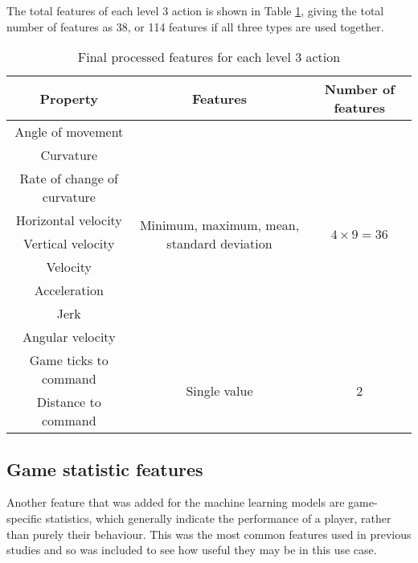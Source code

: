 \documentclass[Report.tex]{subfiles}
\begin{document}
The total features of each level 3 action is shown in Table \ref{tbl-level3features}, giving the total number of features as 38, or 114 features if all three types are used together.
\begin{table}[H]
\renewcommand*{\arraystretch}{1.5}
\centering
\begin{tabular}{| c | c | c |}
\hline
\textbf{Property} & \textbf{Features} & \textbf{Number of features} \\ \hline
Angle of movement & \multirow{9}{6cm}{Minimum, maximum, mean, standard deviation} & \multirow{9}{*}{$4 \times 9  = 36$} \\ \cline{1-1}
Curvature & & \\ \cline{1-1}
Rate of change of curvature & & \\ \cline{1-1}
Horizontal velocity & & \\ \cline{1-1}
Vertical velocity & & \\ \cline{1-1}
Velocity & & \\ \cline{1-1}
Acceleration & & \\ \cline{1-1}
Jerk & & \\ \cline{1-1}
Angular velocity & & \\ \hline
Game ticks to command & \multirow{2}{*}{Single value} & \multirow{2}{*}{2} \\ \cline{1-1}
Distance to command & & \\ \hline
\end{tabular}
\caption{Final processed features for each level 3 action}
\label{tbl-level3features}
\end{table}

\subsection{Game statistic features}
Another feature that was added for the machine learning models are game-specific statistics, which generally indicate the performance of a player, rather than purely their behaviour. This was the most common features used in previous studies and so was included to see how useful they may be in this use case.
\end{document}

